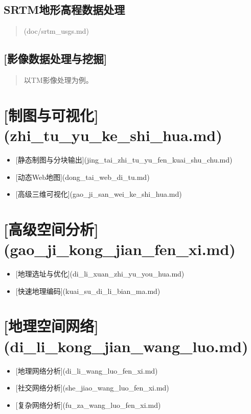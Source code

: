 \documentclass[letterpaper,10pt,english]{sphinxmanual}
\begin{document}
\section{SRTM地形高程数据处理}
\label{index:srtm}\begin{quote}

(doc/srtm\_usgs.md)
\end{quote}


\section{{[}影像数据处理与挖掘{]}}
\label{index:id3}\begin{quote}

以TM影像处理为例。
\end{quote}


\chapter{{[}制图与可视化{]}(zhi\_tu\_yu\_ke\_shi\_hua.md)}
\label{index:zhi-tu-yu-ke-shi-hua-md}\begin{itemize}
\item {} 
{[}静态制图与分块输出{]}(jing\_tai\_zhi\_tu\_yu\_fen\_kuai\_shu\_chu.md)

\item {} 
{[}动态Web地图{]}(dong\_tai\_web\_di\_tu.md)

\item {} 
{[}高级三维可视化{]}(gao\_ji\_san\_wei\_ke\_shi\_hua.md)

\end{itemize}


\chapter{{[}高级空间分析{]}(gao\_ji\_kong\_jian\_fen\_xi.md)}
\label{index:gao-ji-kong-jian-fen-xi-md}\begin{itemize}
\item {} 
{[}地理选址与优化{]}(di\_li\_xuan\_zhi\_yu\_you\_hua.md)

\item {} 
{[}快速地理编码{]}(kuai\_su\_di\_li\_bian\_ma.md)

\end{itemize}


\chapter{{[}地理空间网络{]}(di\_li\_kong\_jian\_wang\_luo.md)}
\label{index:di-li-kong-jian-wang-luo-md}\begin{itemize}
\item {} 
{[}地理网络分析{]}(di\_li\_wang\_luo\_fen\_xi.md)

\item {} 
{[}社交网络分析{]}(she\_jiao\_wang\_luo\_fen\_xi.md)

\item {} 
{[}复杂网络分析{]}(fu\_za\_wang\_luo\_fen\_xi.md)

\end{itemize}
\end{document}
